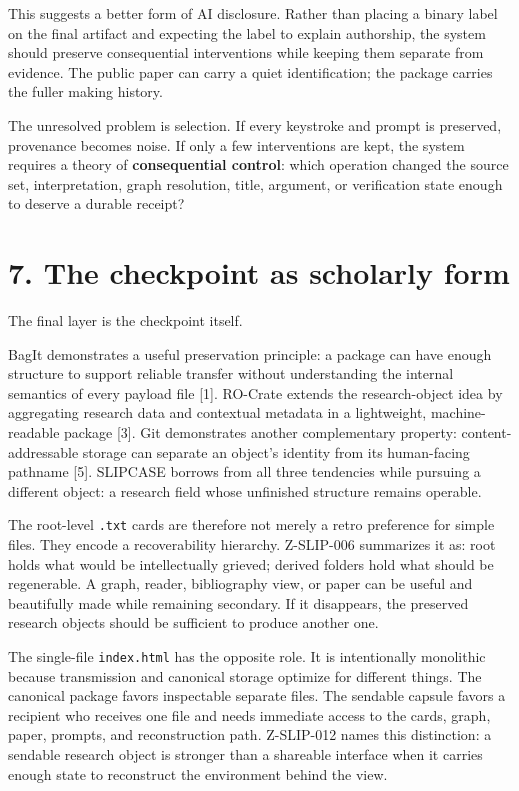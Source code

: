 \documentclass[
  11pt,
]{article}
\begin{document}
This suggests a better form of AI disclosure. Rather than placing a
binary label on the final artifact and expecting the label to explain
authorship, the system should preserve consequential interventions while
keeping them separate from evidence. The public paper can carry a quiet
identification; the package carries the fuller making history.

The unresolved problem is selection. If every keystroke and prompt is
preserved, provenance becomes noise. If only a few interventions are
kept, the system requires a theory of \textbf{consequential control}:
which operation changed the source set, interpretation, graph
resolution, title, argument, or verification state enough to deserve a
durable receipt?

\section{7. The checkpoint as scholarly
form}\label{the-checkpoint-as-scholarly-form}

The final layer is the checkpoint itself.

BagIt demonstrates a useful preservation principle: a package can have
enough structure to support reliable transfer without understanding the
internal semantics of every payload file {[}1{]}. RO-Crate extends the
research-object idea by aggregating research data and contextual
metadata in a lightweight, machine-readable package {[}3{]}. Git
demonstrates another complementary property: content-addressable storage
can separate an object's identity from its human-facing pathname
{[}5{]}. SLIPCASE borrows from all three tendencies while pursuing a
different object: a research field whose unfinished structure remains
operable.

The root-level \texttt{.txt} cards are therefore not merely a retro
preference for simple files. They encode a recoverability hierarchy.
Z-SLIP-006 summarizes it as: root holds what would be intellectually
grieved; derived folders hold what should be regenerable. A graph,
reader, bibliography view, or paper can be useful and beautifully made
while remaining secondary. If it disappears, the preserved research
objects should be sufficient to produce another one.

The single-file \texttt{index.html} has the opposite role. It is
intentionally monolithic because transmission and canonical storage
optimize for different things. The canonical package favors inspectable
separate files. The sendable capsule favors a recipient who receives one
file and needs immediate access to the cards, graph, paper, prompts, and
reconstruction path. Z-SLIP-012 names this distinction: a sendable
research object is stronger than a shareable interface when it carries
enough state to reconstruct the environment behind the view.
\end{document}
